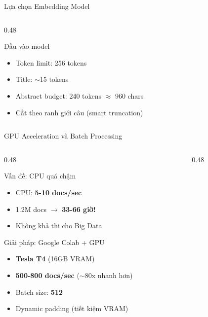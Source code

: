 \begin{frame}{Lựa chọn Embedding Model}
\begin{columns}[T]
\begin{column}{0.48\textwidth}
\begin{block}{Đầu vào model}
{\vspace{0.05cm}
\begin{itemize}\itemsep0pt \parskip0pt 
    \item Token limit: 256 tokens
    \item Title: $\sim$15 tokens
    \item Abstract budget: 240 tokens $\approx$ 960 chars
    \item Cắt theo ranh giới câu (smart truncation)
\end{itemize}
}
\end{block}
\end{column}
\end{columns}
\end{frame}

\begin{frame}{GPU Acceleration và Batch Processing}
\begin{columns}[T]
\begin{column}{0.48\textwidth}

\begin{alertblock}{Vấn đề: CPU quá chậm}
{\footnotesize
\begin{itemize}\itemsep0pt \parskip0pt 
    \item CPU: \textbf{5-10 docs/sec}
    \item 1.2M docs $\to$ \textbf{33-66 giờ!}
    \item Không khả thi cho Big Data
\end{itemize}
}
\end{alertblock}

\vspace{0.05cm}

\begin{exampleblock}{Giải pháp: Google Colab + GPU}
{\footnotesize
\begin{itemize}\itemsep0pt \parskip0pt 
    \item \textbf{Tesla T4} (16GB VRAM)
    \item \textbf{500-800 docs/sec} ($\sim$80x nhanh hơn)
    \item Batch size: \textbf{512}
    \item Dynamic padding (tiết kiệm VRAM)
\end{itemize}
}
\end{exampleblock}

\end{column}
\begin{column}{0.48\textwidth}


\end{column}
\end{columns}
\end{frame}
